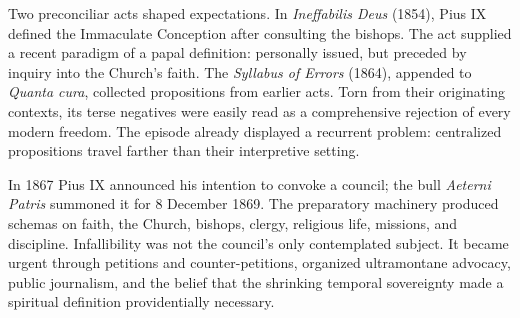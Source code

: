 Two preconciliar acts shaped expectations. In \emph{Ineffabilis Deus} (1854), Pius IX defined the Immaculate Conception after consulting the bishops. The act supplied a recent paradigm of a papal definition: personally issued, but preceded by inquiry into the Church's faith. The \emph{Syllabus of Errors} (1864), appended to \emph{Quanta cura}, collected propositions from earlier acts. Torn from their originating contexts, its terse negatives were easily read as a comprehensive rejection of every modern freedom. The episode already displayed a recurrent problem: centralized propositions travel farther than their interpretive setting.

In 1867 Pius IX announced his intention to convoke a council; the bull \emph{Aeterni Patris} summoned it for 8 December 1869. The preparatory machinery produced schemas on faith, the Church, bishops, clergy, religious life, missions, and discipline. Infallibility was not the council's only contemplated subject. It became urgent through petitions and counter-petitions, organized ultramontane advocacy, public journalism, and the belief that the shrinking temporal sovereignty made a spiritual definition providentially necessary.

